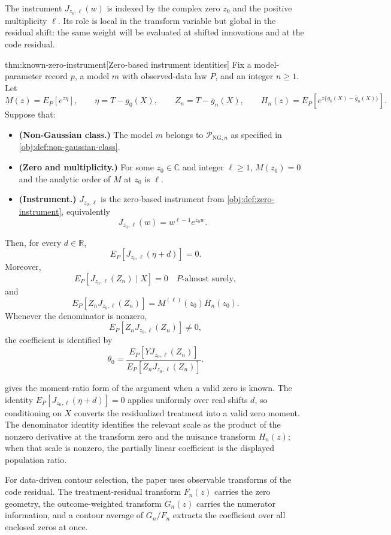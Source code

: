 \documentclass[11pt]{article}
\begin{document}
The instrument \(J_{z_0,\ell}(w)\) is indexed by the complex zero \(z_0\) and the positive multiplicity \(\ell\). Its role is local in the transform variable but global in the residual shift: the same weight will be evaluated at shifted innovations and at the code residual.

\begin{theoremv}{thm:known-zero-instrument}[Zero-based instrument identities]
Fix a model-parameter record \(p\), a model \(m\) with observed-data law \(P\), and an integer \(n\ge 1\). Let
\[
M(z)=E_P\!\left[e^{z\eta}\right],
\qquad
\eta=T-g_0(X),
\qquad
Z_n=T-\bar g_n(X),
\qquad
H_n(z)=E_P\!\left[e^{z\{g_0(X)-\bar g_n(X)\}}\right].
\]
Suppose that:
\begin{itemize}
\item \textbf{(Non-Gaussian class.)} The model \(m\) belongs to \(\mathcal P_{\mathrm{NG},n}\) as specified in \cref{obj:def:non-gaussian-class}.
\item \textbf{(Zero and multiplicity.)} For some \(z_0\in\mathbb C\) and integer \(\ell\ge 1\), \(M(z_0)=0\) and the analytic order of \(M\) at \(z_0\) is \(\ell\).
\item \textbf{(Instrument.)} \(J_{z_0,\ell}\) is the zero-based instrument from \cref{obj:def:zero-instrument}, equivalently
\[
J_{z_0,\ell}(w)=w^{\ell-1}e^{z_0w}.
\]
\end{itemize}
Then, for every \(d\in\mathbb R\),
\[
E_P\!\left[J_{z_0,\ell}(\eta+d)\right]=0.
\]
Moreover,
\[
E_P\!\left[J_{z_0,\ell}(Z_n)\mid X\right]=0
\quad P\text{-almost surely},
\]
and
\[
E_P\!\left[Z_n J_{z_0,\ell}(Z_n)\right]
=
M^{(\ell)}(z_0)H_n(z_0).
\]
Whenever the denominator is nonzero,
\[
E_P\!\left[Z_nJ_{z_0,\ell}(Z_n)\right]\neq 0,
\]
the coefficient is identified by
\[
\theta_0
=
\frac{E_P\!\left[YJ_{z_0,\ell}(Z_n)\right]}
     {E_P\!\left[Z_nJ_{z_0,\ell}(Z_n)\right]}.
\]
\end{theoremv}

 gives the moment-ratio form of the argument when a valid zero is known. The identity \(E_P[J_{z_0,\ell}(\eta+d)]=0\) applies uniformly over real shifts \(d\), so conditioning on \(X\) converts the residualized treatment into a valid zero moment. The denominator identity identifies the relevant scale as the product of the nonzero derivative at the transform zero and the nuisance transform \(H_n(z)\); when that scale is nonzero, the partially linear coefficient is the displayed population ratio.

For data-driven contour selection, the paper uses observable transforms of the code residual. The treatment-residual transform \(F_n(z)\) carries the zero geometry, the outcome-weighted transform \(G_n(z)\) carries the numerator information, and a contour average of \(G_n/F_n\) extracts the coefficient over all enclosed zeros at once.
\end{document}
